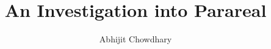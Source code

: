 \documentclass[12pt]{article}
\begin{document}
 
\title{An Investigation into Parareal}
\author{Abhijit Chowdhary} 

\maketitle

\tableofcontents









\end{document}
